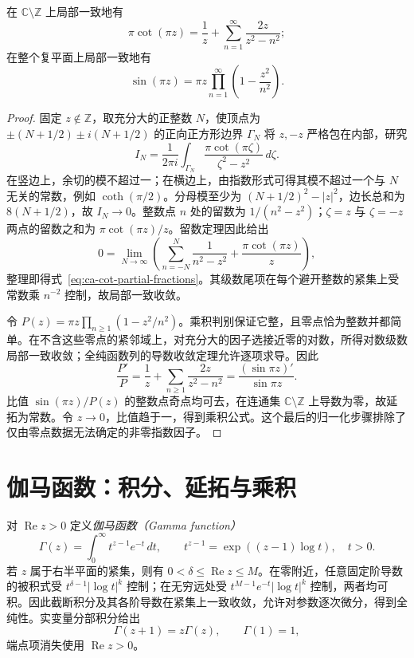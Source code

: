 \begin{theorem}[正弦与余切的展开]
\label{thm:ca-sine-product}
在 $\mathbb C\setminus\mathbb Z$ 上局部一致地有
\begin{equation}
 \pi\cot(\pi z)=\frac1z+\sum_{n=1}^{\infty}\frac{2z}{z^2-n^2};
 \label{eq:ca-cot-partial-fractions}
\end{equation}
在整个复平面上局部一致地有
\begin{equation}
 \sin(\pi z)=\pi z\prod_{n=1}^{\infty}\left(1-\frac{z^2}{n^2}\right).
 \label{eq:ca-sine-product}
\end{equation}
\end{theorem}
\begin{proof}
固定 $z\notin\mathbb Z$，取充分大的正整数 $N$，使顶点为 $\pm(N+1/2)\pm i(N+1/2)$ 的正向正方形边界 $\Gamma_N$ 将 $z,-z$ 严格包在内部，研究
\[
 I_N=\frac1{2\pi i}\int_{\Gamma_N}
 \frac{\pi\cot(\pi\zeta)}{\zeta^2-z^2}\,d\zeta.
\]
在竖边上，余切的模不超过一；在横边上，由指数形式可得其模不超过一个与 $N$ 无关的常数，例如 $\coth(\pi/2)$。分母模至少为 $(N+1/2)^2-|z|^2$，边长总和为 $8(N+1/2)$，故 $I_N\to0$。整数点 $n$ 处的留数为 $1/(n^2-z^2)$；$\zeta=z$ 与 $\zeta=-z$ 两点的留数之和为 $\pi\cot(\pi z)/z$。留数定理因此给出
\[
 0=\lim_{N\to\infty}\left(\sum_{n=-N}^{N}\frac1{n^2-z^2}
 +\frac{\pi\cot(\pi z)}z\right),
\]
整理即得式~\eqref{eq:ca-cot-partial-fractions}。其级数尾项在每个避开整数的紧集上受常数乘 $n^{-2}$ 控制，故局部一致收敛。

令 $P(z)=\pi z\prod_{n\ge1}(1-z^2/n^2)$。乘积判别保证它整，且零点恰为整数并都简单。在不含这些零点的紧邻域上，对充分大的因子选接近零的对数，所得对数级数局部一致收敛；全纯函数列的导数收敛定理允许逐项求导。因此
\[
 \frac{P'}P=\frac1z+\sum_{n\ge1}\frac{2z}{z^2-n^2}
 =\frac{(\sin\pi z)'}{\sin\pi z}.
\]
比值 $\sin(\pi z)/P(z)$ 的整数点奇点均可去，在连通集 $\mathbb C\setminus\mathbb Z$ 上导数为零，故延拓为常数。令 $z\to0$，比值趋于一，得到乘积公式。这个最后的归一化步骤排除了仅由零点数据无法确定的非零指数因子。
\end{proof}

\section{伽马函数：积分、延拓与乘积}

对 $\operatorname{Re}z>0$ 定义\emph{伽马函数（Gamma function）}
\begin{equation}
 \Gamma(z)=\int_0^{\infty}t^{z-1}e^{-t}\,dt,
 \qquad t^{z-1}=\exp((z-1)\log t),\quad t>0.
 \label{eq:ca-gamma-integral}
\end{equation}
若 $z$ 属于右半平面的紧集，则有 $0<\delta\le\operatorname{Re}z\le M$。在零附近，任意固定阶导数的被积式受 $t^{\delta-1}|\log t|^k$ 控制；在无穷远处受 $t^{M-1}e^{-t}|\log t|^k$ 控制，两者均可积。因此截断积分及其各阶导数在紧集上一致收敛，允许对参数逐次微分，得到全纯性。实变量分部积分给出
\begin{equation}
 \Gamma(z+1)=z\Gamma(z),\qquad \Gamma(1)=1,
 \label{eq:ca-gamma-recurrence}
\end{equation}
端点项消失使用 $\operatorname{Re}z>0$。

